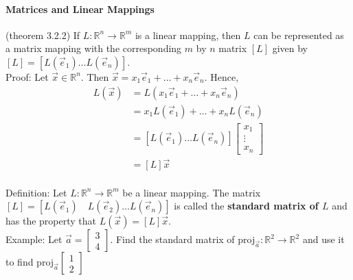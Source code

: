 \documentclass[10pt,letter]{article}
\begin{document}
\paragraph{Matrices and Linear Mappings} (theorem 3.2.2) If $L:\mathbb{R}^n\rightarrow\mathbb{R}^m$ is a linear mapping, then $L$ can be represented as a matrix mapping with the corresponding $m$ by $n$ matrix $[L]$ given by $[L]=[L(\vec{e}_1)\ldots L(\vec{e}_n)]$.  \\ 
Proof: Let $\vec{x}\in\mathbb{R}^n$. Then $\vec{x}=x_1\vec{e}_1+\ldots+x_n\vec{e}_n$. Hence, \begin{align*} L(\vec{x})&=L(x_1\vec{e}_1+\ldots+x_n\vec{e}_n)\\ &= x_1L(\vec{e}_1)+\ldots+x_nL(\vec{e}_n)\\ &=[L(\vec{e}_1)\ldots L(\vec{e}_n)]\begin{bmatrix}x_1\\\vdots\\x_n\end{bmatrix}\\&=[L]\vec{x}\end{align*} \\ 
Definition: Let $L:\mathbb{R}^n\rightarrow\mathbb{R}^m$ be a linear mapping. The matrix $[L] = [L(\vec{e}_1)\quad L(\vec{e}_2)\ldots L(\vec{e}_n)]$ is called the \textbf{standard matrix of $L$} and has the property that $L(\vec{x})=[L]\vec{x}$. \\ 
Example: Let $\vec{a}=\begin{bmatrix}3\\4\end{bmatrix}$. Find the standard matrix of proj$_{\vec{a}}:\mathbb{R}^2\rightarrow\mathbb{R}^2$ and use it to find proj$_{\vec{a}}\begin{bmatrix}1\\2\end{bmatrix}$ \\ 
\end{document}
